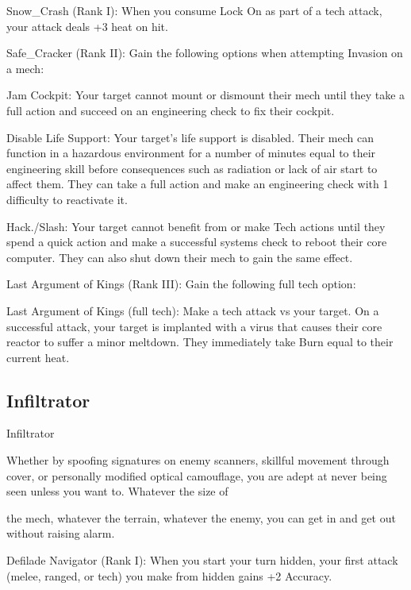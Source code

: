 Snow\_Crash (Rank I): When you consume Lock On as part of a tech attack, your attack deals  
+3 heat on hit.
 
Safe\_Cracker (Rank II): Gain the following options when attempting Invasion on a mech:
 
         Jam Cockpit: Your target cannot mount or dismount their mech until they take a full  
         action and succeed on an engineering check to fix their cockpit.
 
         Disable Life Support: Your target’s life support is disabled. Their mech can function in a  
         hazardous environment for a number of minutes equal to their engineering skill before  
         consequences such as radiation or lack of air start to affect them. They can take a full  
         action and make an engineering check with 1 difficulty to reactivate it.
 
         Hack./Slash: Your target cannot benefit from or make Tech actions until they spend a  
         quick action and make a successful systems check to reboot their core computer. They  
         can also shut down their mech to gain the same effect.
 
Last Argument of Kings (Rank III): Gain the following full tech option:
 
	        Last Argument of Kings (full tech): Make a tech attack vs your target. On a successful  
attack, your target is implanted with a virus that causes their core reactor to suffer a minor  
meltdown. They immediately take Burn equal to their current heat.
 
\subsection{Infiltrator}

                                                    Infiltrator  

Whether by spoofing signatures on enemy scanners, skillful movement through cover, or personally  
modified optical camouflage, you are adept at never being seen unless you want to. Whatever the size of  

the mech, whatever the terrain, whatever the enemy, you can get in and get out without raising alarm.   

                                                                                                                  


Defilade Navigator (Rank I): When you start your turn hidden, your first attack (melee, ranged,  
or tech) you make from hidden gains +2 Accuracy.
 

